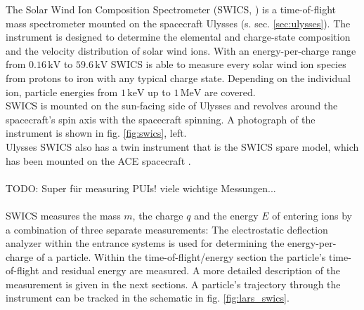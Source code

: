 The Solar Wind Ion Composition Spectrometer (SWICS, \citet{gloeckler_1992}) is a time-of-flight mass spectrometer mounted on the spacecraft Ulysses (s. sec. \ref{sec:ulysses}). The instrument is designed to determine the elemental and charge-state composition and the velocity distribution of solar wind ions. With an energy-per-charge range from $0.16 \, \mathrm{kV}$ to $59.6 \, \mathrm{kV}$ SWICS is able to measure every solar wind ion species from protons to iron with any typical charge state. Depending on the individual ion, particle energies from $1 \,\mathrm{keV}$ up to $1 \, \mathrm{MeV}$ are covered.\\
SWICS is mounted on the sun-facing side of Ulysses and revolves around the spacecraft's spin axis with the spacecraft spinning. A photograph of the instrument is shown in fig. \ref{fig:swics}, left.\\
Ulysses SWICS also has a twin instrument that is the SWICS spare model, which has been mounted on the ACE spacecraft \citep{stone_ace}.
\\ \\ 
TODO: Super für measuring PUIs! viele wichtige Messungen... \\ \\
%
%
%
SWICS measures the mass $m$, the charge $q$ and the energy $E$ of entering ions by a combination of three separate measurements: The electrostatic deflection analyzer within the entrance systems is used for determining the energy-per-charge of a particle. Within the time-of-flight/energy section the particle's time-of-flight and residual energy are measured. A more detailed description of the measurement is given in the next sections. A particle's trajectory through the instrument can be tracked in the schematic in fig. \ref{fig:lars_swics}.
%

